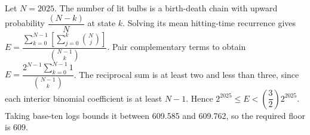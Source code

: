 Let $N=2025$. The number of lit bulbs is a birth-death chain with upward probability $\dfrac{(N-k)}{N}$ at state $k$. Solving its mean hitting-time recurrence gives $E=\dfrac{\sum_{k=0}^{N-1}[\sum_{j=0}^k\binom Nj]}{\binom{N-1}k}$. Pair complementary terms to obtain $E=\dfrac{2^{N-1}\sum_{k=0}^{N-1}1}{\binom{N-1}k}$. The reciprocal sum is at least two and less than three, since each interior binomial coefficient is at least $N-1$. Hence $2^{2025}\le E<(\dfrac{3}{2})2^{2025}$. Taking base-ten logs bounds it between 609.585 and 609.762, so the required floor is $\boxed{609}$.
